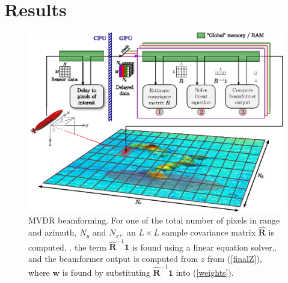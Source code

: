 \documentclass[
a4paper,10pt
]{common/ica2013_2}
\renewcommand\vec[1]{\boldsymbol{#1}}
\newcommand\mat[1]{\boldsymbol{#1}}
\newcommand\1{\vec 1}
\newcommand*\w{\vec w}
\newcommand*\eR{\mat{\hat R}}
\begin{document}
\section{Results}

\begin{figure}[!t]\centering
\includegraphics[width=\linewidth]{gfx/implementation.eps}
\caption{MVDR beamforming. For one of the total number of pixels in range and azimuth, $N_y$ and $N_x$,. an $L\times{}L$ sample covariance matrix $\eR$ is computed, . the term $\eR^{-1}\1$ is found using a linear equation solver,. and the beamformer output is computed from $z$ from (\ref{finalZ}), where $\w$ is found by substituting $\eR^{-1}\1$ into (\ref{weights}). } \label{mvdr_beamforming}
\end{figure}
\end{document}
